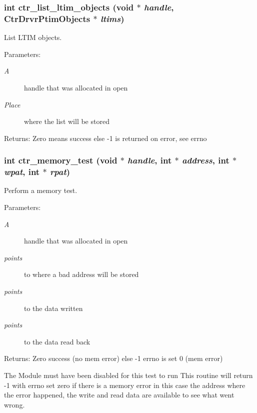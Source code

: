\subsubsection{\setlength{\rightskip}{0pt plus 5cm}int ctr\_\-list\_\-ltim\_\-objects (void $\ast$ {\em handle}, Ctr\-Drvr\-Ptim\-Objects $\ast$ {\em ltims})}\label{libctr_8doxygen_9fd26ac9be8ded5db0caa4cef1876952}


List LTIM objects. 

\begin{Desc}
\item[Parameters:]
\begin{description}
\item[{\em A}]handle that was allocated in open \item[{\em Place}]where the list will be stored \end{description}
\end{Desc}
\begin{Desc}
\item[Returns:]Zero means success else -1 is returned on error, see errno \end{Desc}
\subsubsection{\setlength{\rightskip}{0pt plus 5cm}int ctr\_\-memory\_\-test (void $\ast$ {\em handle}, int $\ast$ {\em address}, int $\ast$ {\em wpat}, int $\ast$ {\em rpat})}\label{libctr_8doxygen_8cdb803537399fc1b1eff193b9998362}


Perform a memory test. 

\begin{Desc}
\item[Parameters:]
\begin{description}
\item[{\em A}]handle that was allocated in open \item[{\em points}]to where a bad address will be stored \item[{\em points}]to the data written \item[{\em points}]to the data read back \end{description}
\end{Desc}
\begin{Desc}
\item[Returns:]Zero success (no mem error) else -1 errno is set 0 (mem error)\end{Desc}
The Module must have been disabled for this test to run This routine will return -1 with errno set zero if there is a memory error in this case the address where the error happened, the write and read data are available to see what went wrong. 
